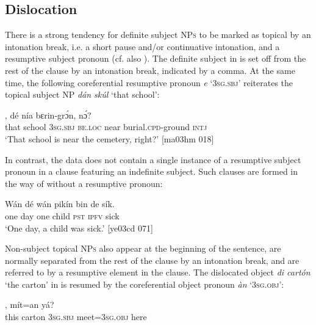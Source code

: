 \subsection{Dislocation}\label{sec:7.5.1}

There is a strong tendency for definite subject \textsc{NPs} to be marked as topical by an intonation break, i.e. a short pause and/or continuative intonation, and a resumptive subject pronoun (cf. also ). The definite subject in  is set off from the rest of the clause by an intonation break, indicated by a comma. At the same time, the following coreferential resumptive pronoun \textit{e} ‘\textsc{3sg.sbj}’ reiterates the topical subject \textsc{NP} \textit{dán skúl} ‘that school’:


\ea%
    \label{ex:key:748}
    \gll {}    ,      dé    nía    bɛrin-grɔ́n,    nɔ́?\\
that    school  \textsc{3sg.sbj}  \textsc{be.loc}  near    burial.\textsc{cpd}{}-ground  \textsc{intj}\\

\glt ‘That school is near the cemetery, right?’ [ma03hm 018]
\z

In contrast, the data does not contain a single instance of a resumptive subject pronoun in a clause featuring an indefinite subject. Such clauses are formed in the way of  without a resumptive pronoun: 


\ea%
    \label{ex:key:749}
    \gll Wán    dé  wán  pikín  bin  de  sík.\\
one    day  one  child  \textsc{pst}  \textsc{ipfv}  sick\\

\glt ‘One day, a child was sick.’ [ye03cd 071]
\z

Non-subject topical \textsc{NPs} also appear at the beginning of the sentence, are normally separated from the rest of the clause by an intonation break, and are referred to by a resumptive element in the clause. The dislocated object \textit{di cartón} ‘the carton’ in  is resumed by the coreferential object pronoun \textit{àn} ‘\textsc{3sg.obj}’:


\ea%
    \label{ex:key:750}
    \gll {}  ,   mít=an    yá?\\
this  carton  \textsc{3sg.sbj}  meet=\textsc{3sg.obj}  here\\


